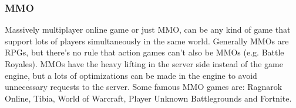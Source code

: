 \subsubsection{MMO}
Massively multiplayer online game or just MMO, can be any kind of game that support lots of players simultaneously in the same world. Generally MMOs are RPGs, but there's no rule that action games can't also be MMOs (e.g. Battle Royales). MMOs have the heavy lifting in the server side instead of the game engine, but a lots of optimizations can be made in the engine to avoid unnecessary requests to the server\cite{GameEngineArchitecture}. Some famous MMO games are: Ragnarok Online, Tibia, World of Warcraft, Player Unknown Battlegrounds and Fortnite\cite{MMOGames,BattleRoyaleGames}.